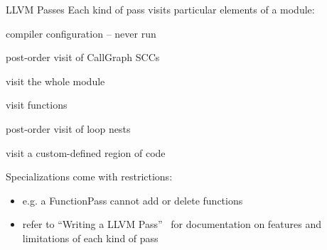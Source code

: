 \begin{frame}{LLVM Passes}
Each kind of pass visits particular elements of a module:

\begin{description}[align=left, labelwidth=1cm]
\item[ImmutablePass] compiler configuration -- never run
\item[CallGraphSCCPass] post-order visit of CallGraph SCCs
\item[ModulePass] visit the whole module
\item[FunctionPass] visit functions
\item[LoopPass] post-order visit of loop nests
\item[RegionPass] visit a custom-defined region of code
\end{description}

\vfill
Specializations come with restrictions:

\begin{itemize}
\item e.g. a \alert{FunctionPass} cannot add or delete functions
\item refer to ``Writing a LLVM Pass''~\cite{LOCAL:www/llvmWritingAPass}
      for documentation on features and limitations of each kind of pass
\end{itemize}
\end{frame}


%
%
%
%


